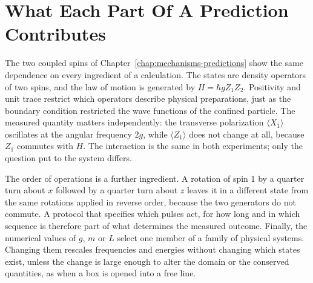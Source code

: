 \documentclass[11pt,oneside]{book}
\begin{document}
\section{What Each Part Of A Prediction Contributes}
The two coupled spins of Chapter~\ref{chap:mechanisms-predictions} show the same dependence on every ingredient of a
calculation. The states are density operators of two spins, and the law of motion is generated by \(H=\hbar gZ_1Z_2\).
Positivity and unit trace restrict which operators describe physical preparations, just as the boundary condition
restricted the wave functions of the confined particle. The measured quantity matters independently: the transverse
polarization \(\langle X_1\rangle\) oscillates at the angular frequency \(2g\), while \(\langle Z_1\rangle\) does not
change at all, because \(Z_1\) commutes with \(H\). The interaction is the same in both experiments; only the question
put to the system differs.

The order of operations is a further ingredient. A rotation of spin 1 by a quarter turn about \(x\) followed by a
quarter turn about \(z\) leaves it in a different state from the same rotations applied in reverse order, because the
two generators do not commute. A protocol that specifies which pulses act, for how long and in which sequence is
therefore part of what determines the measured outcome. Finally, the numerical values of \(g\), \(m\) or \(L\) select
one member of a family of physical systems. Changing them rescales frequencies and energies without changing which
states exist, unless the change is large enough to alter the domain or the conserved quantities, as when a box is
opened into a free line.
\end{document}
